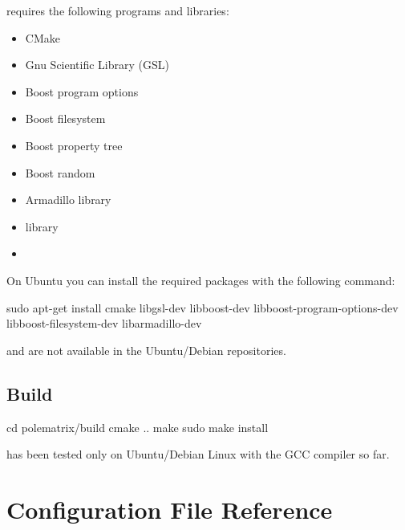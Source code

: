 \documentclass[a4paper]{scrartcl}
\begin{document}
\polem requires the following programs and libraries:
\begin{itemize}
\item CMake
\item Gnu Scientific Library (GSL)
\item Boost program options
\item Boost filesystem
\item Boost property tree
\item Boost random
\item Armadillo library
\item \pal library
\item \ele
\end{itemize}
On Ubuntu you can install the required packages with the following command:
\begin{bashcode}
  sudo apt-get install cmake libgsl-dev libboost-dev libboost-program-options-dev libboost-filesystem-dev libarmadillo-dev
\end{bashcode}
%
\ele and \pal are not available in the Ubuntu/Debian repositories. 
    
\subsection{Build \polem}
\label{sec:build}

\begin{bashcode}
  cd polematrix/build
  cmake ..
  make
  sudo make install
\end{bashcode}
\polem has been tested only on Ubuntu/Debian Linux with the GCC compiler so far.

\section{Configuration File Reference}
\label{sec:config}


\clearpage
\appendix
\printbibliography[heading=bibintoc]
\end{document}
